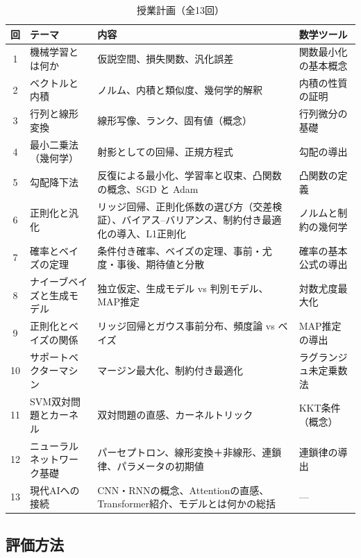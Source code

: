 \begin{table}[H]
  \centering
  \caption{授業計画（全13回）}
  \label{tab:schedule}
  \small
  \begin{tabular}{c|l|p{5.2cm}|p{4.2cm}}
    \hline
    回 & テーマ & 内容 & 数学ツール \\
    \hline\hline
    1 & 機械学習とは何か & 仮説空間、損失関数、汎化誤差 & 関数最小化の基本概念 \\
    \hline
    2 & ベクトルと内積 & ノルム、内積と類似度、幾何学的解釈 & 内積の性質の証明 \\
    \hline
    3 & 行列と線形変換 & 線形写像、ランク、固有値（概念） & 行列微分の基礎 \\
    \hline
    4 & 最小二乗法（幾何学） & 射影としての回帰、正規方程式 & 勾配の導出 \\
    \hline
    5 & 勾配降下法 & 反復による最小化、学習率と収束、凸関数の概念、SGD と Adam & 凸関数の定義 \\
    \hline
    6 & 正則化と汎化 & リッジ回帰、正則化係数の選び方（交差検証）、バイアス--バリアンス、制約付き最適化の導入、L1正則化 & ノルムと制約の幾何学 \\
    \hline
    7 & 確率とベイズの定理 & 条件付き確率、ベイズの定理、事前・尤度・事後、期待値と分散 & 確率の基本公式の導出 \\
    \hline
    8 & ナイーブベイズと生成モデル & 独立仮定、生成モデル vs 判別モデル、MAP推定 & 対数尤度最大化 \\
    \hline
    9 & 正則化とベイズの関係 & リッジ回帰とガウス事前分布、頻度論 vs ベイズ & MAP推定の導出 \\
    \hline
    10 & サポートベクターマシン & マージン最大化、制約付き最適化 & ラグランジュ未定乗数法 \\
    \hline
    11 & SVM双対問題とカーネル & 双対問題の直感、カーネルトリック & KKT条件（概念） \\
    \hline
    12 & ニューラルネットワーク基礎 & パーセプトロン、線形変換＋非線形、連鎖律、パラメータの初期値 & 連鎖律の導出 \\
    \hline
    13 & 現代AIへの接続 & CNN・RNNの概念、Attentionの直感、Transformer紹介、モデルとは何かの総括 & --- \\
    \hline
  \end{tabular}
\end{table}

\subsection{評価方法}

